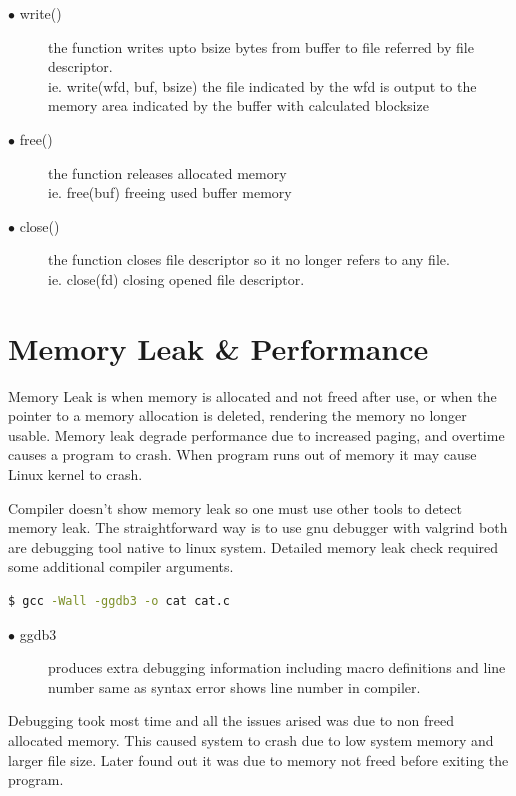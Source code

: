 \documentclass[12pt,a4paper,oneside]{report}
\begin{document}
\begin{description}
\item[$\bullet$ write()]
the function writes  upto bsize bytes from buffer to file referred by file descriptor.\\
ie. write(wfd, buf, bsize) the file indicated by the wfd is output to the memory area indicated by the buffer with calculated blocksize

\item[$\bullet$ free()]
the function releases allocated memory\\
ie. free(buf) freeing used buffer memory

\item[$\bullet$ close()]
the function closes file descriptor so it no longer refers to any file.\\
ie. close(fd) closing opened file descriptor.


\end{description}

\section*{Memory Leak \& Performance}
Memory Leak is when memory is allocated and not freed after use, or when the pointer to a memory allocation is deleted, rendering the memory no longer usable. Memory leak degrade performance due to increased paging, and overtime causes a program to crash. When program runs out of memory it may cause Linux kernel to crash.

Compiler doesn't show memory leak so one must use other tools to detect memory leak.
The straightforward way is to use gnu debugger with valgrind both are debugging tool native to linux system.
Detailed memory leak check required some additional compiler arguments.

\begin{lstlisting}[language=bash]
$ gcc -Wall -ggdb3 -o cat cat.c 

\end{lstlisting}
\begin{description}

\item[$\bullet$ ggdb3] produces extra debugging information including macro definitions and line number same as syntax error shows line number in compiler.\\
\end{description}
Debugging took most time and all the issues arised was due to non freed allocated memory. This caused system to crash due to low system memory and larger file size.
Later found out it was due to memory not freed before exiting the program.
\end{document}
